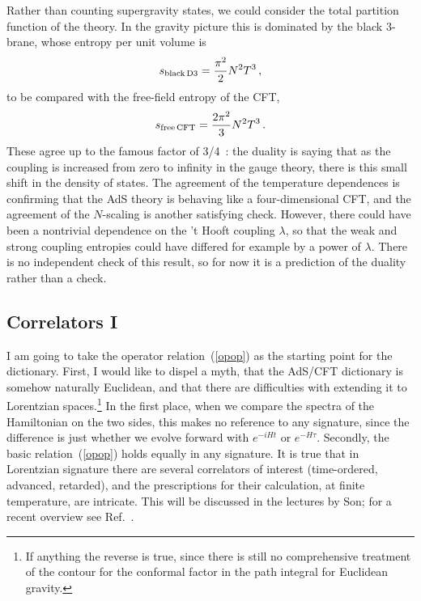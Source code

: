 \documentclass[12pt]{article}
\begin{document}
{Rather than counting supergravity states, we could consider the total partition function of the theory.  In the gravity picture this is dominated by the black 3-brane, whose entropy per unit volume is
\begin{equation}
s_{\rm black\,D3} = \frac{\pi^2}{2} N^2 T^3 \,,
\end{equation}
to be compared with the free-field entropy of the CFT,
\begin{equation}
s_{\rm free\,CFT} = \frac{2\pi^2}{3} N^2 T^3 \,.
\end{equation}
These agree up to the famous factor of 3/4~\cite{Gubser:1996de}: the duality is saying that as the coupling is increased from zero to infinity in the gauge theory, there is this small shift in the density of states.
The agreement of the temperature dependences is confirming that the AdS theory is behaving like a four-dimensional CFT, and the agreement of the $N$-scaling is another satisfying check.  However, there could have been a nontrivial dependence on the 't Hooft coupling $\lambda$, so that the weak and strong coupling entropies could have differed for example by a power of $\lambda$.  There is no independent check of this result, so for now it is a prediction of the duality rather than a check. 

\subsection{Correlators I}

I am going to take the operator relation~(\ref{opop}) as the starting point for the dictionary.  First, I would like to dispel a myth, that the AdS/CFT dictionary is somehow naturally Euclidean, and that there are difficulties with extending it to Lorentzian spaces.\footnote{If anything the reverse is true, since there is still no comprehensive treatment of the contour for the conformal factor in the path integral for Euclidean gravity.}  In the first place, when we compare the spectra of the Hamiltonian on the two sides, this makes no reference to any signature, since the difference is just whether we evolve forward with $e^{-iHt}$ or $e^{-H\tau}$.  Secondly, the basic relation~(\ref{opop}) holds equally in any signature.  It is true that in Lorentzian signature there are several correlators of interest (time-ordered, advanced, retarded), and the prescriptions for their calculation, at finite temperature, are intricate.  This will be discussed in the lectures by Son; for a recent overview see Ref.~\cite{Skenderis:2008dg}.

}
\end{document}
